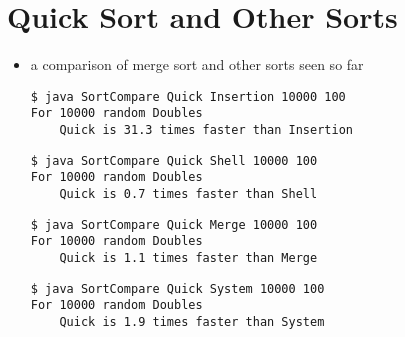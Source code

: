 \documentclass[8pt,a4paper,compress]{beamer}
\begin{document}
\section{Quick Sort and Other Sorts}
\begin{frame}[fragile]
\begin{itemize}
\item a comparison of merge sort and other sorts seen so far
\begin{lstlisting}[language={}]
$ java SortCompare Quick Insertion 10000 100
For 10000 random Doubles
    Quick is 31.3 times faster than Insertion
\end{lstlisting}

\begin{lstlisting}[language={}]
$ java SortCompare Quick Shell 10000 100
For 10000 random Doubles
    Quick is 0.7 times faster than Shell
\end{lstlisting}

\begin{lstlisting}[language={}]
$ java SortCompare Quick Merge 10000 100
For 10000 random Doubles
    Quick is 1.1 times faster than Merge
\end{lstlisting}

\begin{lstlisting}[language={}]
$ java SortCompare Quick System 10000 100
For 10000 random Doubles
    Quick is 1.9 times faster than System
\end{lstlisting}
\end{itemize}
\end{frame}
\end{document}
